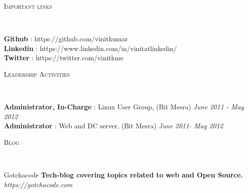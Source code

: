 \documentclass[9pt]{article}
\newenvironment{changemargin}[2]{%
  \begin{list}{}{%
    \setlength{\topsep}{0pt}%
    \setlength{\leftmargin}{#1}%
    \setlength{\rightmargin}{#2}%
    \setlength{\listparindent}{\parindent}%
    \setlength{\itemindent}{\parindent}%
    \setlength{\parsep}{\parskip}%
  }%
  \item[]}{\end{list}
}
\newcommand{\lineover}{
    \begin{changemargin}{-0.05in}{-0.05in}
        \vspace*{-8pt}
        \hrulefill \\
        \vspace*{-2pt}
    \end{changemargin}
}
\newcommand{\header}[1]{
    \begin{changemargin}{-0.5in}{-0.5in}
        \scshape{#1}\\
    \lineover
    \end{changemargin}
}
\newenvironment{body} {
    \vspace*{-16pt}
    \begin{changemargin}{-0.25in}{-0.5in}
  }
    {\end{changemargin}
}
\begin{document}
\smallskip


\header{Important links}

\begin{body}
    \vspace{14pt}
    \textbf{Github} : https://github.com/vinitkumar \hfill{}\\
    \smallskip
    \textbf{Linkedin} : https://www.linkedin.com/in/vinitatlinkedin/ \hfill{}\\
    \smallskip
    \textbf{Twitter} : https://twitter.com/vinitkme \hfill{}\\
\end{body}

\smallskip

\header{Leadership Activities}

\begin{body}
    \vspace{14pt}
    \textbf{Administrator, In-Charge} : Linux User Group, (Bit Mesra) \hfill {} \emph{June 2011 - May 2012}\\
    \smallskip
    \textbf{Administrator} : Web and DC server, (Bit Mesra) \hfill{} \emph{June 2011- May 2012}\\
\end{body}

\smallskip

\header{Blog}

\begin{body}
    \vspace{14pt}
    Gotchacode \textbf{Tech-blog covering topics related to web and Open Source.} \emph{ https://gotchacode.com}\\
    \smallskip
\end{body}

\smallskip
\end{document}
